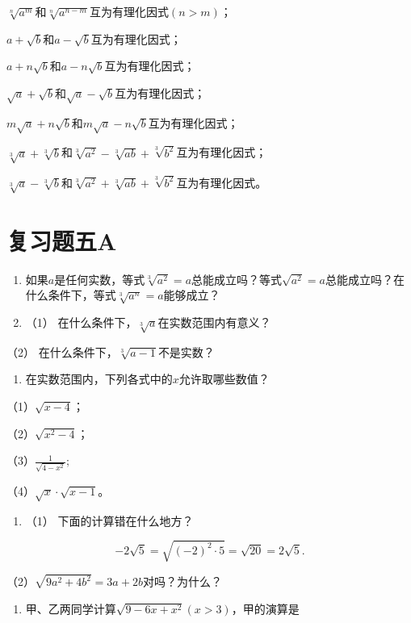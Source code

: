\(\sqrt[n]{a^{m}}\)和\(\sqrt[n]{a^{n-m}}\)互为有理化因式\((n>m)\)；

\(a+\sqrt{b}\)和\(a-\sqrt{b}\)互为有理化因式；

\(a+n\sqrt{b}\)和\(a-n\sqrt{b}\)互为有理化因式；

\(\sqrt{a}+\sqrt{b}\)和\(\sqrt{a}-\sqrt{b}\)互为有理化因式；

\(m\sqrt{a} + n\sqrt{b}\)和\(m\sqrt{a} - n\sqrt{b}\)互为有理化因式；

\(\sqrt[3]{a}+\sqrt[3]{b}\)和\(\sqrt[3]{a^{2}}-\sqrt[3]{ab}+\sqrt[3]{b^{2}}\)互为有理化因式；

\(\sqrt[3]{a}-\sqrt[3]{b}\)和\(\sqrt[3]{a^{2}}+\sqrt[3]{ab}+\sqrt[3]{b^{2}}\)互为有理化因式。

\section{复习题五A}

\begin{enumerate}
\item
  如果\(a\)是任何实数，等式\(\sqrt[3]{a^2} = a\)总能成立吗？等式\(\sqrt{a^2} = a\)总能成立吗？在什么条件下，等式\(\sqrt[3]{a^n} = a\)能够成立？
\item
  （1） 在什么条件下，\(\sqrt[3]{a}\)在实数范围内有意义？
\end{enumerate}

（2） 在什么条件下，\(\sqrt[3]{a-1}\)不是实数？

\begin{enumerate}[start=3]
\item
  在实数范围内，下列各式中的\(x\)允许取哪些数值？
\end{enumerate}

（1）\(\sqrt{x - 4}\)；

（2）\(\sqrt{x^2 - 4}\)；

（3）\(\frac{1}{\sqrt{4 - x^2}};\)

（4）\(\sqrt{x} \cdot \sqrt{x - 1}\)。

\begin{enumerate}[start=4]
\item
  （1） 下面的计算错在什么地方？
\end{enumerate}

\[
- 2 \sqrt {5} = \sqrt {(- 2) ^ {2} \cdot 5} = \sqrt {20} = 2 \sqrt {5}.
\]

（2）\(\sqrt{9a^2 + 4b^2} = 3a + 2b\)对吗？为什么？

\begin{enumerate}[start=5]
\item
  甲、乙两同学计算\(\sqrt{9 - 6x + x^2} (x > 3)\)，甲的演算是
\end{enumerate}

